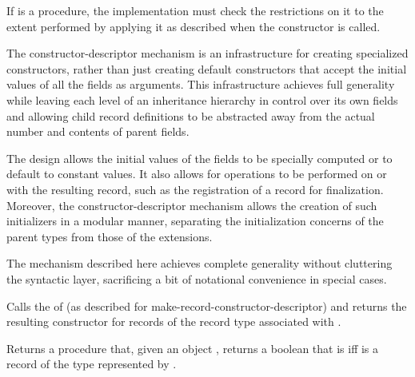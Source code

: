\begin{entry}{%
}
\implresp If  is a procedure, the implementation must
check the restrictions on it to the extent performed by applying it as
described when the constructor is called.

\begin{rationale}
  The constructor-descriptor mechanism is an infra\-struc\-ture for
  creating specialized constructors, rather than just creating default
  constructors that accept the initial values of all the fields as
  arguments. This infrastructure achieves full generality while
  leaving each level of an inheritance hierarchy in control over its
  own fields and allowing child record definitions to be abstracted
  away from the actual number and contents of parent fields.

  The design allows the initial values of the fields to be specially
  computed or to default to constant values. It also allows for
  operations to be performed on or with the resulting record, such as
  the registration of a record for finalization. Moreover, the
  constructor-descriptor mechanism allows the creation of such
  initializers in a modular manner, separating the initialization
  concerns of the parent types from those of the extensions.
  
  The mechanism described here achieves complete generality without
  cluttering the syntactic layer, sacrificing a bit of
  notational convenience in special cases.
\end{rationale}

\end{entry}

\begin{entry}{%
}
   
Calls the  of  (as described for
{\cf make-record-constructor-descriptor}) and returns the resulting
constructor  for records of the record type
associated with .
\end{entry}

\begin{entry}{%
}
   
Returns a procedure that, given an object , returns
a boolean that is \schtrue{}
iff  is a record of the type represented by
.
\end{entry}

